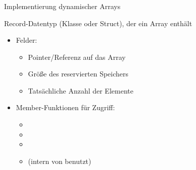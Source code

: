 \begin{frame}
\frametitle{\insertsection}
\begin{block}
{Implementierung dynamischer Arrays}
\end{block}
\vspace{-1em}
\begin{block}
{Record-Datentyp (Klasse oder Struct), der ein Array enthält}
\begin{itemize}
	\item Felder:
	\begin{itemize}
		\item Pointer/Referenz auf das Array
		\item Größe des reservierten Speichers
		\item Tatsächliche Anzahl der Elemente
	\end{itemize}
	\item<2-> Member-Funktionen für Zugriff:
	\begin{itemize}
		\item {}
		\item {}
		\item {}
		\item {} (intern von  benutzt)
	\end{itemize}
\end{itemize}
\end{block}
\end{frame}